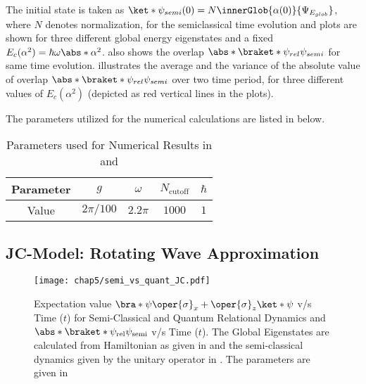 The initial state is taken as \(\ket*{\psi_{semi}(0)} = N\innerGlob{\alpha(0)}{\Psi_{E_{glob}}}\), where $N$ denotes normalization, for the semiclassical time evolution and plots are shown 
for three different global energy eigenstates and a fixed \(E_c(\alpha^2) = \hbar \omega \abs*{\alpha}^2\).  also shows the overlap \(\abs*{\braket*{\psi_{rel}}{\psi_{semi}}}\)
for same time evolution.  illustrates the average and the 
variance of the absolute value of overlap \(\abs*{\braket*{\psi_{rel}}{\psi_{semi}}}\) over two time period, 
for three different values of \(E_c(\alpha^2)\) (depicted as red vertical lines in the plots). 

The parameters utilized for the numerical calculations are listed in  below.
\begin{table}[ht]
    \centering
    \label{tab:numerical_values_linear}
        \begin{tabular}{|c|c|c|c|c|}
            \hline
            Parameter & $g$ & $\omega$ & $N_{\text{cutoff}}$ & $\hbar$ \\
            \hline
            Value & $2\pi/100$ & $2.2\pi$ & $1000$ & $1$ \\
            \hline
        \end{tabular}
    \caption{Parameters used for Numerical Results in  and 
    }
\end{table}





\subsection*{JC-Model: Rotating Wave Approximation}
\begin{figure}[!h]
    \centering
    \texttt{[image: chap5/semi\_vs\_quant\_JC.pdf]}
    \caption{
    Expectation value
        \(\bra*{\psi} \oper{\sigma}_x + \oper{\sigma}_z \ket*{\psi}\) v/s Time ($t$) for Semi-Classical and Quantum Relational Dynamics
    and \(\abs*{\braket*{\psi_{\mathrm{rel}}}{\psi_{\mathrm{semi}}}}\) v/s Time ($t$). The Global Eigenstates are calculated from 
    Hamiltonian as given in  and the semi-classical dynamics given by the unitary operator in . The parameters 
    are given in 
    }
    \label{fig:chap5_JCM_semi_vs_quant}
\end{figure}


